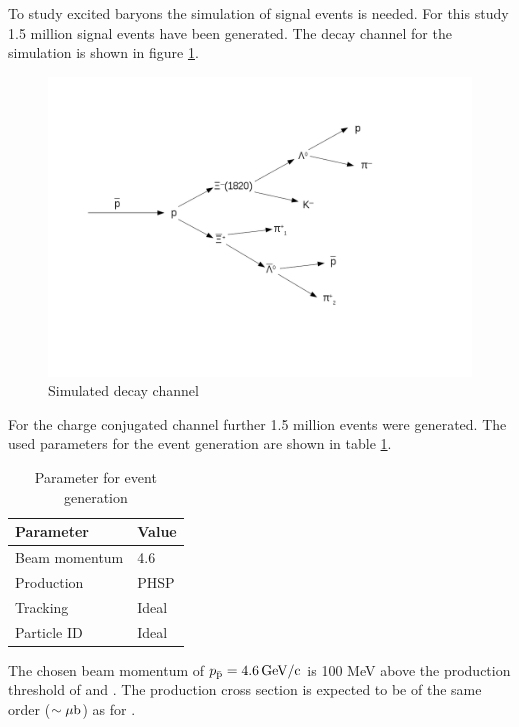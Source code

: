 To study excited \cascade baryons the simulation of signal events is needed.
For this study 1.5 million signal events have been generated.
The decay channel for the simulation is shown in figure \ref{fig:eventgeneration_decaychannel}. 

\begin{figure}[htbp]
	\centering
			\includegraphics[width=1.00\textwidth]{./plots/DecayChannelXi1820.png}
	\caption{Simulated decay channel}
	\label{fig:eventgeneration_decaychannel}
\end{figure}

For the charge conjugated channel further 1.5 million events were generated.
The used parameters for the event generation are shown in table \ref{tab:eventgeneration_parameter}.

\begin{table}[tbp]
	\caption{Parameter for event generation}
	\label{tab:eventgeneration_parameter}
	\centering
	\begin{tabular}{ll}
		\hline
		Parameter & Value \\
		\hline
		\hline
		Beam momentum & 4.6 \massunit \\
		Production & PHSP \\
		Tracking & Ideal \\
		Particle ID & Ideal \\\hline
		 
	\end{tabular}
\end{table}

The chosen beam momentum of $p_{\bar{\textnormal{p}}} = 4.6\, \textnormal{GeV/c}$ is 100 MeV above the production threshold of \excitedcascade and \anticascade.
The production cross section is expected to be of the same order ($\sim \mu\textnormal{b}$) as for \cascade \cite{PANDAphysics2009}.\\
\vspace{11pt} 

